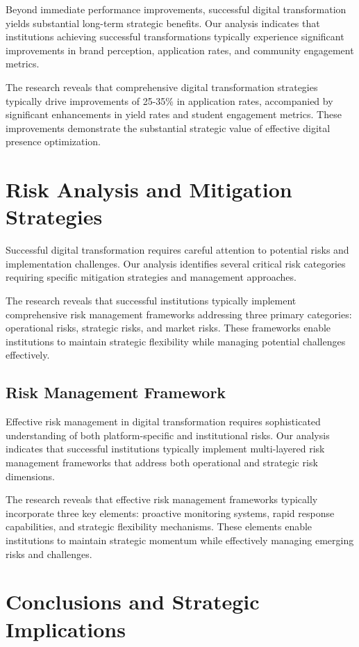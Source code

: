 \documentclass[12pt]{report}
\begin{document}
Beyond immediate performance improvements, successful digital transformation yields substantial long-term strategic benefits. Our analysis indicates that institutions achieving successful transformations typically experience significant improvements in brand perception, application rates, and community engagement metrics.

The research reveals that comprehensive digital transformation strategies typically drive improvements of 25-35\% in application rates, accompanied by significant enhancements in yield rates and student engagement metrics. These improvements demonstrate the substantial strategic value of effective digital presence optimization.

\chapter{Risk Analysis and Mitigation Strategies}

Successful digital transformation requires careful attention to potential risks and implementation challenges. Our analysis identifies several critical risk categories requiring specific mitigation strategies and management approaches.

The research reveals that successful institutions typically implement comprehensive risk management frameworks addressing three primary categories: operational risks, strategic risks, and market risks. These frameworks enable institutions to maintain strategic flexibility while managing potential challenges effectively.

\section{Risk Management Framework}

Effective risk management in digital transformation requires sophisticated understanding of both platform-specific and institutional risks. Our analysis indicates that successful institutions typically implement multi-layered risk management frameworks that address both operational and strategic risk dimensions.

The research reveals that effective risk management frameworks typically incorporate three key elements: proactive monitoring systems, rapid response capabilities, and strategic flexibility mechanisms. These elements enable institutions to maintain strategic momentum while effectively managing emerging risks and challenges.

\chapter{Conclusions and Strategic Implications}
\end{document}
